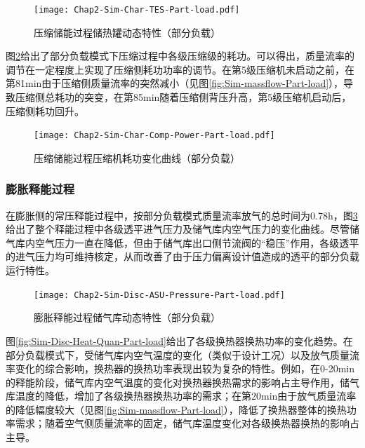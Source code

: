 \begin{figure}[H] %
  \centering
  \texttt{[image: Chap2-Sim-Char-TES-Part-load.pdf]}
  \caption{压缩储能过程储热罐动态特性（部分负载）}
  \label{fig:Sim-Char-TES-Part-load}
\end{figure}

图\ref{fig:Sim-Char-Comp-Power-Part-load}给出了部分负载模式下压缩过程中各级压缩级的耗功。可以得出，质量流率的调节在一定程度上实现了压缩侧耗功功率的调节。在第5级压缩机未启动之前，在第81min由于压缩侧质量流率的突然减小（见图\ref{fig:Sim-massflow-Part-load}），导致压缩侧总耗功的突变，在第85min随着压缩侧背压升高，第5级压缩机启动后，压缩侧耗功回升。

\begin{figure}[H] %
  \centering
  \texttt{[image: Chap2-Sim-Char-Comp-Power-Part-load.pdf]}
  \caption{压缩储能过程压缩机耗功变化曲线（部分负载）}
  \label{fig:Sim-Char-Comp-Power-Part-load}
\end{figure}

\subsubsection{膨胀释能过程}
在膨胀侧的常压释能过程中，按部分负载模式质量流率放气的总时间为0.78h，图\ref{fig:Sim-Disc-ASU-Pressure-Part-load}给出了整个释能过程中各级透平进气压力及储气库内空气压力的变化曲线。尽管储气库内空气压力一直在降低，但由于储气库出口侧节流阀的“稳压”作用，各级透平的进气压力均可维持核定，从而改善了由于压力偏离设计值造成的透平的部分负载运行特性。

\begin{figure}[H] %
  \centering
  \texttt{[image: Chap2-Sim-Disc-ASU-Pressure-Part-load.pdf]}
  \caption{膨胀释能过程储气库动态特性（部分负载）}
  \label{fig:Sim-Disc-ASU-Pressure-Part-load}
\end{figure}

图\ref{fig:Sim-Disc-Heat-Quan-Part-load}给出了各级换热器换热功率的变化趋势。在部分负载模式下，受储气库内空气温度的变化（类似于设计工况）以及放气质量流率变化的综合影响，换热器的换热功率表现出较为复杂的特性。例如，在0-20min的释能阶段，储气库内空气温度的变化对换热器换热需求的影响占主导作用，储气库温度的降低，增加了各级换热器换热功率的需求；在第20min由于放气质量流率的降低幅度较大（见图\ref{fig:Sim-massflow-Part-load}），降低了换热器整体的换热功率需求；随着空气侧质量流率的固定，储气库温度变化对各级换热器换热的影响占主导。

